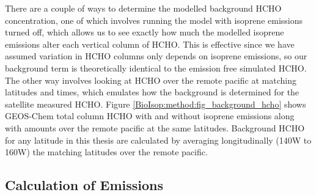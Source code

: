    There are a couple of ways to determine the modelled background HCHO concentration, one of which involves running the model with isoprene emissions turned off, which allows us to see exactly how much the modelled isoprene emissions alter each vertical column of HCHO.
    This is effective since we have assumed variation in HCHO columns only depends on isoprene emissions, so our background term is theoretically identical to the emission free simulated HCHO.
    The other way involves looking at HCHO over the remote pacific at matching latitudes and times, which emulates how the background is determined for the satellite measured HCHO.
    Figure \ref{BioIsop:method:fig_background_hcho} shows GEOS-Chem total column HCHO with and without isoprene emissions along with amounts over the remote pacific at the same latitudes.
    Background HCHO for any latitude in this thesis are calculated by averaging longitudinally (140\degr W to 160\degr W) the matching latitudes over the remote pacific.
    
    
    
    
  \subsection{Calculation of Emissions}
    \label{BioIsop:method:calculation}
   
